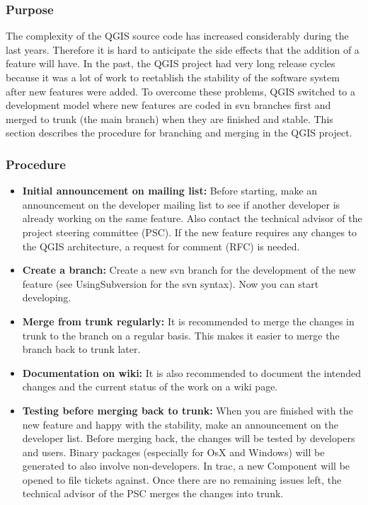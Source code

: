 \subsubsection{Purpose}
The complexity of the QGIS source code has increased considerably during the
last years. Therefore it is hard to anticipate the side effects that the
addition of a feature will have. In the past, the QGIS project had very long
release cycles because it was a lot of work to reetablish the stability of the
software system after new features were added. To overcome these problems, QGIS
switched to a development model where new features are coded in svn branches
first and merged to trunk (the main branch) when they are finished and stable.
This section describes the procedure for branching and merging in the QGIS
project.

\hypertarget{toc36}{}
\subsubsection{Procedure}
\begin{itemize}
\item \textbf{Initial announcement on mailing list:}
Before starting, make an announcement on the developer mailing list to see if
another developer is already working on the same feature. Also contact the
technical advisor of the project steering committee (PSC). If the new feature
requires any changes to the QGIS architecture, a request for comment (RFC) is
needed. 

\item \textbf{Create a branch:} 
Create a new svn branch for the development of the new feature (see
UsingSubversion for the svn syntax). Now you can start developing.

\item \textbf{Merge from trunk regularly:}
It is recommended to merge the changes in trunk to the branch on a regular
basis. This makes it easier to merge the branch back to trunk later.

\item \textbf{Documentation on wiki:} 
It is also recommended to document the intended changes and the current status
of the work on a wiki page.

\item \textbf{Testing before merging back to trunk:} 
When you are finished with the new feature and happy with the stability, make
an announcement on the developer list.  Before merging back, the changes will
be tested by developers and users. Binary packages (especially for OsX and
Windows) will be generated to also involve non-developers. In trac, a new
Component will be opened to file tickets against.  Once there are no remaining
issues left, the technical advisor of the PSC merges the changes into trunk.

\end{itemize}


